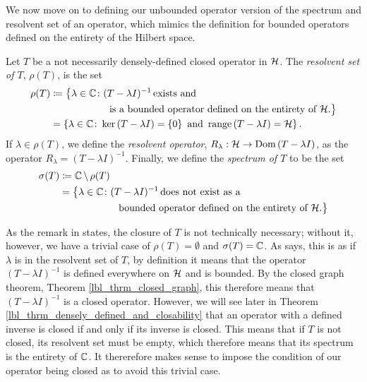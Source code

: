 We now move on to defining our unbounded operator version of the spectrum and resolvent set of an operator, which mimics the definition for bounded operators defined on the entirety of the Hilbert space.

\begin{definition}\label{lbl_def_spectrum}
  Let $T$ be a not necessarily densely-defined closed operator in $\mathcal{H}$. The {\emph{resolvent set of $T$}}, $\rho(T)$, is the set
  \begin{align*}
    \rho(T)
    &\coloneqq \big\{\lambda \in \mathbb{C} \colon (T - \lambda I)^{-1} \,\text{exists and} \\ &\qquad\qquad\qquad\text{is a bounded operator defined on the entirety of $\mathcal{H}$}.\big\} \\
    &=
    \left\{\lambda \in \mathbb{C} \colon \operatorname{ker}\left(T - \lambda I\right) = \left\{0\right\} \,\,\text{and}\,\,\operatorname{range}\left(T - \lambda I\right) = \mathcal{H}\right\}.
  \end{align*}
  If $\lambda \in \rho(T)$, we define the {\emph{resolvent operator}}, $R_\lambda: \mathcal{H} \to \operatorname{Dom}\left(T - \lambda I\right)$, as the operator \(R_\lambda = (T - \lambda I)^{-1}.\) Finally, we define the {\emph{spectrum of $T$}} to be the set
  \begin{align*}
    \sigma(T)
    &\coloneqq
    \mathbb{C}\, \backslash \,\rho(T) \\
    &=
    \big\{\lambda \in \mathbb{C} \colon (T - \lambda I)^{-1} \,\text{does not exist as a}\\ &\qquad\qquad\qquad \text{bounded operator defined on the entirety of $\mathcal{H}$}.\big\}
  \end{align*}
\end{definition}
\begin{remark}\label{lbl_remark_spectrum}
  As the remark in {\cite[p.28]{konrad}} states, the closure of $T$ is not technically necessary; without it, however, we have a trivial case of $\rho(T) = \emptyset$ and $\sigma(T) = \mathbb{C}$. As {\cite[p.28]{konrad}} says, this is as if $\lambda$ is in the resolvent set of $T$, by definition it means that the operator $(T - \lambda I)^{-1}$ is defined everywhere on $\mathcal{H}$ and is bounded. By the closed graph theorem, Theorem \eqref{lbl_thrm_closed_graph}, this therefore means that $(T - \lambda I)^{-1}$ is a closed operator. However, we will see later in Theorem \eqref{lbl_thrm_densely_defined_and_closability} that an operator with a defined inverse is closed if and only if its inverse is closed. This means that if $T$ is not closed, its resolvent set must be empty, which therefore means that its spectrum is the entirety of $\mathbb{C}$. It thererefore makes sense to impose the condition of our operator being closed as to avoid this trivial case.
\end{remark}

